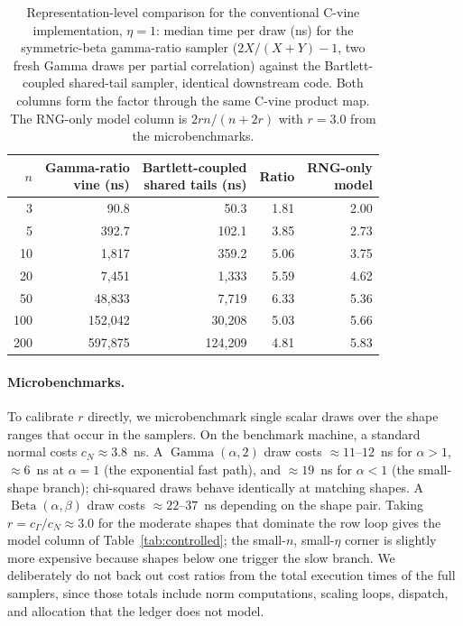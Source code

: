 \documentclass[12pt,english]{article}
\theoremstyle{plain} %
\theoremstyle{definition} %
\theoremstyle{remark} %
\begin{document}
\begin{table}[t]
\centering
\caption{Representation-level comparison for the conventional C-vine implementation, $\eta=1$: median time per draw (ns) for the symmetric-beta gamma-ratio sampler ($2X/(X+Y)-1$, two fresh Gamma draws per partial correlation) against the Bartlett-coupled shared-tail sampler, identical downstream code. Both columns form the factor through the same C-vine product map. The RNG-only model column is $2rn/(n+2r)$ with $r=3.0$ from the microbenchmarks.}
\label{tab:controlled_vine}
\begin{tabular}{rrrrr}
\toprule
$n$ & \makecell{Gamma-ratio\\vine (ns)} & \makecell{Bartlett-coupled\\shared tails (ns)} & Ratio & \makecell{RNG-only\\model} \\
\midrule
  3 &     90.8 &     50.3 & 1.81 & 2.00 \\
  5 &    392.7 &    102.1 & 3.85 & 2.73 \\
 10 &  1{,}817 &    359.2 & 5.06 & 3.75 \\
 20 &  7{,}451 &  1{,}333 & 5.59 & 4.62 \\
 50 & 48{,}833 &  7{,}719 & 6.33 & 5.36 \\
100 & 152{,}042 & 30{,}208 & 5.03 & 5.66 \\
200 & 597{,}875 & 124{,}209 & 4.81 & 5.83 \\
\bottomrule
\end{tabular}
\end{table}

\paragraph{Microbenchmarks.}
To calibrate $r$ directly, we microbenchmark single scalar draws over the shape ranges that occur in the samplers. On the benchmark machine, a standard normal costs $c_N\approx3.8$~ns. A $\operatorname{Gamma}(\alpha,2)$ draw costs $\approx11$--$12$~ns for $\alpha>1$, $\approx6$~ns at $\alpha=1$ (the exponential fast path), and $\approx19$~ns for $\alpha<1$ (the small-shape branch); chi-squared draws behave identically at matching shapes. A $\operatorname{Beta}(\alpha,\beta)$ draw costs $\approx22$--$37$~ns depending on the shape pair. Taking $r=c_\Gamma/c_N\approx3.0$ for the moderate shapes that dominate the row loop gives the model column of Table~\ref{tab:controlled}; the small-$n$, small-$\eta$ corner is slightly more expensive because shapes below one trigger the slow branch. We deliberately do not back out cost ratios from the total execution times of the full samplers, since those totals include norm computations, scaling loops, dispatch, and allocation that the ledger does not model.
\end{document}
